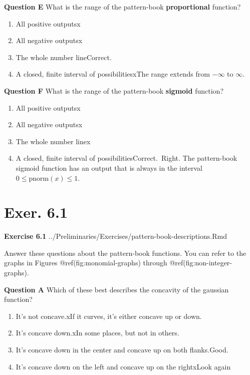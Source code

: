 \documentclass[
  letterpaper,
  DIV=11,
  numbers=noendperiod,
  oneside]{article}
\providecommand{\tightlist}{%
  \setlength{\itemsep}{0pt}\setlength{\parskip}{0pt}}\usepackage{longtable,booktabs,array}
\newcommand{\pnorm}{\text{pnorm}}
\begin{document}
\begin{multicols}{2}
\textbf{Question E} What is the range of the pattern-book
\textbf{proportional} function?

\begin{enumerate}
\def\labelenumi{\roman{enumi}.}
\tightlist
\item
  {All positive outputs{x}}\\
\item
  {All negative outputs{x}}\\
\item
  {The whole number line{Correct.~}}\\
\item
  {A closed, finite interval of possibilities{xThe range extends from
  \(-\infty\) to \(\infty\).}}
\end{enumerate}

\textbf{Question F} What is the range of the pattern-book
\textbf{sigmoid} function?

\begin{enumerate}
\def\labelenumi{\roman{enumi}.}
\tightlist
\item
  {All positive outputs{x}}\\
\item
  {All negative outputs{x}}\\
\item
  {The whole number line{x}}\\
\item
  {A closed, finite interval of possibilities{Correct.~Right. The
  pattern-book sigmoid function has an output that is always in the
  interval \(0 \leq \pnorm(x) \leq 1 .\)}}
\end{enumerate}

\hypertarget{exer.-6.1}{%
\section*{Exer. 6.1}\label{exer.-6.1}}

\textbf{Exercise 6.1}
../Preliminaries/Exercises/pattern-book-descriptions.Rmd

Answer these questions about the pattern-book functions. You can refer
to the graphs in Figures @ref(fig:monomial-graphs) through
@ref(fig:non-integer-graphs).

\textbf{Question A} Which of these best describes the concavity of the
gaussian function?

\begin{enumerate}
\def\labelenumi{\roman{enumi}.}
\tightlist
\item
  {It's not concave.{xIf it curves, it's either concave up or
  down.}}\\
\item
  {It's concave down.{xIn some places, but not in others.}}\\
\item
  {It's concave down in the center and concave up on both
  flanks.{Good.~}}\\
\item
  {It's concave down on the left and concave up on the right{xLook
  again}}
\end{enumerate}


\end{multicols}
\end{document}
